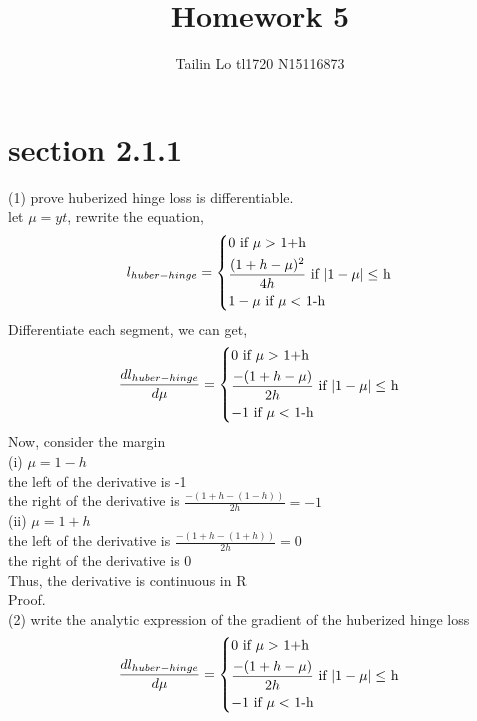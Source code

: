\documentclass [12pt] {article}
\begin{document}
\title{Homework 5}
\date{}
\author{Tailin Lo tl1720 N15116873}
\maketitle

\section{section 2.1.1}
(1) prove huberized hinge loss is differentiable. \\
let $\mu = yt$, rewrite the equation,
\begin{equation}
l_{huber-hinge} = \begin{dcases*}
				0 \text{ if $\mu >$ 1+h}  \\
				\frac{(1+h-\mu)^2}{4h} \text{ if $|1-\mu| \leq $ h} \\
				1-\mu \text{ if $\mu <$ 1-h }
			   \end{dcases*}
\end{equation}
Differentiate each segment, we can get,
\begin{equation}
\frac{dl_{huber-hinge}}{d\mu} = \begin{dcases*}
				0 \text{ if $\mu >$ 1+h}  \\
				\frac{-(1+h-\mu)}{2h} \text{ if $|1-\mu| \leq $ h} \\
				-1 \text{ if $\mu <$ 1-h }
			   \end{dcases*}
\end{equation}
Now, consider the margin  \\
(i) $\mu = 1-h$ \\
the left of the derivative is -1 \\
the right of the derivative is $\frac{-(1+h-(1-h))}{2h} = -1$ \\
(ii) $\mu = 1+h$ \\
the left of the derivative is  $\frac{-(1+h-(1+h))}{2h} = 0$ \\
the right of the derivative is 0 \\
Thus, the derivative is continuous in R \\
Proof. \\

(2) write the analytic expression of the gradient of the huberized hinge loss \\
\begin{equation}
\frac{dl_{huber-hinge}}{d\mu} = \begin{dcases*}
				0 \text{ if $\mu >$ 1+h}  \\
				\frac{-(1+h-\mu)}{2h} \text{ if $|1-\mu| \leq $ h} \\
				-1 \text{ if $\mu <$ 1-h }
			   \end{dcases*}
\end{equation}
\end{document}
